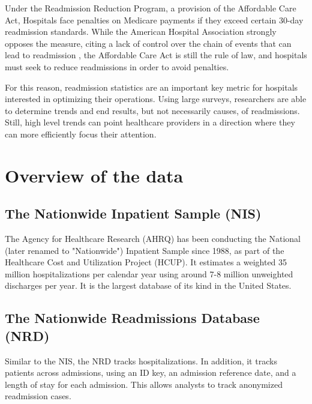 \documentclass[12pt]{ociamthesis}\usepackage[]{graphicx}\usepackage[]{color}
\begin{document}
Under the Readmission Reduction Program, a provision of the Affordable Care Act, 
Hospitals face penalties on Medicare payments if they exceed certain 30-day readmission standards. While the 
American Hospital Association strongly opposes the measure, citing a lack of control over the chain of events
that can lead to readmission \cite{Rice2015, AHA2018}, the Affordable Care Act is still the rule of law, and hospitals must seek
to reduce readmissions in order to avoid penalties.

For this reason, readmission statistics are an important key metric for hospitals interested in optimizing 
their operations. Using large surveys, researchers are able to determine trends and end results, but not necessarily 
causes, of readmissions. Still, high level trends can point healthcare providers in a direction where they can
more efficiently focus their attention. 





\cite{Lessa2015}

\section{Overview of the data}

\subsection{The Nationwide Inpatient Sample (NIS)}

The Agency for Healthcare Research (AHRQ) has been conducting the National (later renamed to "Nationwide") Inpatient
Sample since 1988, as part of the Healthcare Cost and Utilization Project (HCUP). It estimates a weighted 35 million
hospitalizations per calendar year using around 7-8 million unweighted discharges per year. It is the largest database
of its kind in the United States. \cite{NISOverview}

\subsection{The Nationwide Readmissions Database (NRD)}

Similar to the NIS, the NRD tracks hospitalizations. In addition, it tracks patients across admissions, using an ID key,
an admission reference date, and a length of stay for each admission. This allows analysts to track anonymized readmission cases.
\cite{NRDOverview}
\end{document}
